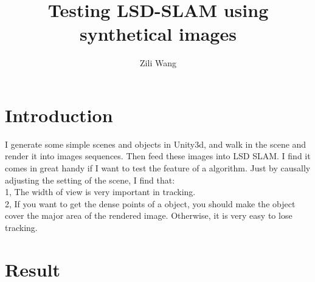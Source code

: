 \documentclass[11pt, oneside]{article}   	%
\title{Testing LSD-SLAM using synthetical images}
\author{Zili Wang}
\begin{document}
\maketitle
\section{Introduction}
I generate some simple scenes and objects in Unity3d, and walk in the scene and render it into images sequences. Then feed these images into LSD SLAM. I find it comes in great handy if I want to test the feature of a algorithm. Just by causally adjusting the setting of the scene, I find that:\\
1, The width of view is very important in tracking.\\
2, If you want to get the dense points of a object, you should make the object cover the major area of the rendered image. Otherwise, it is very easy to lose tracking.\\

\section{Result}
\end{document}
